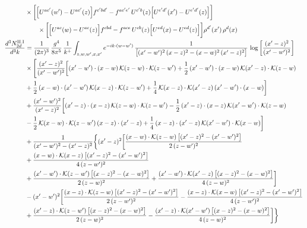 \documentclass[9pt]{article}
\numberwithin{equation}{section}
\begin{document}
\begin{align}
&\times\bigg[\Big[U^{ac'}(w')-U^{ac'}(z)\Big]f^{c'bd'}-f^{ac'e'}\,U^{c'b}(z)\Big[U^{e'd'}(x')-U^{e'd'}(z)\Big]\bigg]\notag\\&\qquad\times\bigg[\Big[U^{ac}(w)-U^{ac}(z)\Big]f^{cbd}-f^{ace}\,U^{cb}(z)\Big[U^{ed}(x)-U^{ed}(z)\Big]\bigg]\rho^{d'}(x')\,\rho^{d}(x)\\
\frac{d^{3}N^{\rm II.I}_{2d}}{d^{3}k}&= \frac{1}{(2\pi)^{3}}\,\frac{g^{4}}{8\pi^{5}}\,\frac{1}{k^{+}}\int_{z,w,w^{\prime},x,x^{\prime}}e^{-ik\cdot{(w-w^{\prime})}}\,\frac{1}{\big[(x^{\prime}-w^{\prime})^{2}\,(x-z)^{2}-(x-w)^{2}\,(x^{\prime}-z)^{2}\big]}\,\log\left[\frac{(x^{\prime}-z)^{2}}{(x^{\prime}-w^{\prime})^{2}}\right]\notag\\
&\times\Bigg[\frac{(x^{\prime}-z)^{2}}{(x^{\prime}-w^{\prime})^{2}}\bigg[(x^{\prime}-w^{\prime})\cdot(x-w)\,\mathcal{K}(z-w)\cdot\mathcal{K}(z-w^{\prime})+\frac{1}{2}\,(x^{\prime}-w^{\prime})\cdot(x-w)\,\mathcal{K}(x^{\prime}-z)\cdot\mathcal{K}(z-w)\notag \\ & +\frac{1}{2}\,(x-w)\cdot(x^{\prime}-w^{\prime})\,\mathcal{K}(x-z)\cdot\mathcal{K}(z-w^{\prime})+\frac{1}{4}\,\mathcal{K}(x-z)\cdot\mathcal{K}(x^{\prime}-z)\,(x^{\prime}-w^{\prime})\cdot(x-w)\bigg]\notag\\
&+\frac{(x^{\prime}-w^{\prime})^{2}}{(x^{\prime}-z)^{2}}\bigg[(x^{\prime}-z)\cdot(x-z)\,\mathcal{K}(z-w)\cdot\mathcal{K}(z-w^{\prime})-\frac{1}{2}\,(x^{\prime}-z)\cdot(x-z)\,\mathcal{K}(x^{\prime}-w^{\prime})\cdot\mathcal{K}(z-w)\notag \\ & -\frac{1}{2}\,\mathcal{K}(x-w)\cdot\mathcal{K}(z-w^{\prime})\,(x-z)\cdot(x^{\prime}-z)+\frac{1}{4}\,(x-z)\cdot(x^{\prime}-z)\,\mathcal{K}(x^{\prime}-w^{\prime})\cdot\mathcal{K}(x-w)\bigg]\notag\\
&+\frac{1}{(x^{\prime}-w^{\prime})^{2}-(x^{\prime}-z)^{2}}\bigg\{(x^{\prime}-z)^{2}\bigg[\frac{(x-w)\cdot\mathcal{K}(z-w)\,\big[(x^{\prime}-z)^{2}-(x^{\prime}-w^{\prime})^{2}\big]}{2\,(z-w^{\prime})^{2}}\notag\\ &+\frac{(x-w)\cdot\mathcal{K}(x-z)\,\big[(x^{\prime}-z)^{2}-(x^{\prime}-w^{\prime})^{2}\big]}{4\,(z-w^{\prime})^{2}}\notag \\ & +\frac{(x^{\prime}-w^{\prime})\cdot\mathcal{K}(z-w^{\prime})\,\big[(x-z)^{2}-(x-w)^{2}\big]}{2\,(z-w)^{2}}+\frac{(x^{\prime}-w^{\prime})\cdot\mathcal{K}(x^{\prime}-z)\,\big[(x-z)^{2}-(x-w)^{2}\big]}{4\,(z-w)^{2}}\bigg]\notag\\
&-(x^{\prime}-w^{\prime})^{2}\bigg[\frac{(x-z)\cdot\mathcal{K}(z-w)\,\big[(x^{\prime}-z)^{2}-(x^{\prime}-w^{\prime})^{2}\big]}{2\,(z-w^{\prime})^{2}}-\frac{(x-z)\cdot\mathcal{K}(x-w)\,\big[(x^{\prime}-z)^{2}-(x^{\prime}-w^{\prime})^{2}\big]}{4\,(z-w^{\prime})^{2}}\notag \\ & +\frac{(x^{\prime}-z)\cdot\mathcal{K}(z-w^{\prime})\,\big[(x-z)^{2}-(x-w)^{2}\big]}{2\,(z-w)^{2}}-\frac{(x^{\prime}-z)\cdot\mathcal{K}(x^{\prime}-w^{\prime})\,\big[(x-z)^{2}-(x-w)^{2}\big]}{4\,(z-w)^{2}}\bigg]\bigg\}\notag\\

\end{align}
\end{document}
